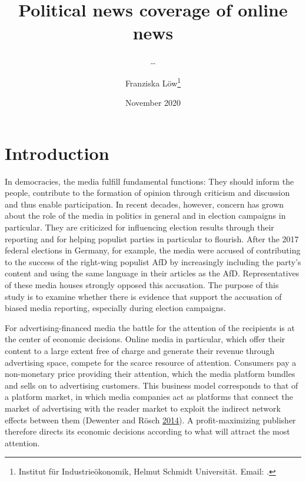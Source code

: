 \documentclass[
]{article}
\title{Political news coverage of online news}
\subtitle{\ldots{}}
\author{Franziska Löw\footnote{Institut für Industrieökonomik, Helmut Schmidt
  Universität. Email: .}}
\date{November 2020}
\begin{document}
\maketitle

\hypertarget{introduction}{%
\section{Introduction}\label{introduction}}

In democracies, the media fulfill fundamental functions: They should
inform the people, contribute to the formation of opinion through
criticism and discussion and thus enable participation. In recent
decades, however, concern has grown about the role of the media in
politics in general and in election campaigns in particular. They are
criticized for influencing election results through their reporting and
for helping populist parties in particular to flourish. After the 2017
federal elections in Germany, for example, the media were accused of
contributing to the success of the right-wing populist AfD by
increasingly including the party's content and using the same language
in their articles as the AfD. Representatives of these media houses
strongly opposed this accusation. The purpose of this study is to
examine whether there is evidence that support the accusation of biased
media reporting, especially during election campaigns.

For advertising-financed media the battle for the attention of the
recipients is at the center of economic decisions. Online media in
particular, which offer their content to a large extent free of charge
and generate their revenue through advertising space, compete for the
scarce resource of attention. Consumers pay a non-monetary price
providing their attention, which the media platform bundles and sells on
to advertising customers. This business model corresponds to that of a
platform market, in which media companies act as platforms that connect
the market of advertising with the reader market to exploit the indirect
network effects between them (Dewenter and Rösch
\protect\hyperlink{ref-dewenter_einfuhrung_2014}{2014}). A
profit-maximizing publisher therefore directs its economic decisions
according to what will attract the most attention.
\end{document}

